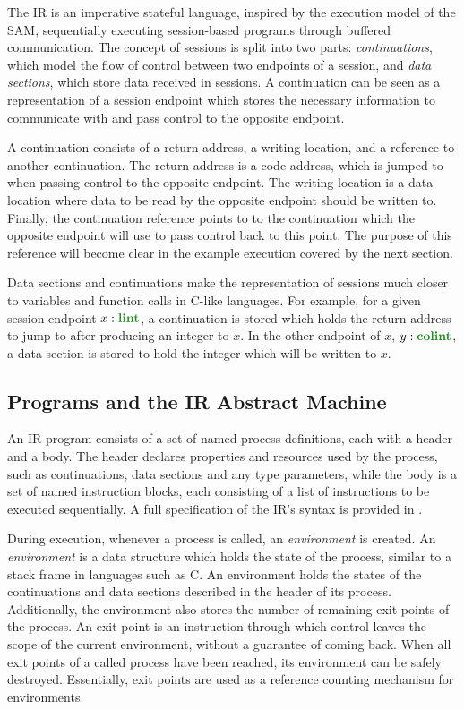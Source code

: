 The \ac{IR} is an imperative stateful language, inspired by the execution model of the \ac{SAM}, sequentially executing session-based programs through buffered communication. The concept of sessions is split into two parts: \textit{continuations}, which model the flow of control between two endpoints of a session, and \textit{data sections}, which store data received in sessions. A continuation can be seen as a representation of a session endpoint which stores the necessary information to communicate with and pass control to the opposite endpoint.

A continuation consists of a return address, a writing location, and a reference to another continuation. The return address is a code address, which is jumped to when passing control to the opposite endpoint. The writing location is a data location where data to be read by the opposite endpoint should be written to. Finally, the continuation reference points to to the continuation which the opposite endpoint will use to pass control back to this point. The purpose of this reference will become clear in the example execution covered by the next section.

Data sections and continuations make the representation of sessions much closer to variables and function calls in C-like languages. For example, for a given session endpoint $x: \lintt$, a continuation is stored which holds the return address to jump to after producing an integer to $x$. In the other endpoint of $x$, $y: \colintt$, a data section is stored to hold the integer which will be written to $x$.

\subsection{Programs and the IR Abstract Machine}

An \ac{IR} program consists of a set of named process definitions, each with a header and a body. The header declares properties and resources used by the process, such as continuations, data sections and any type parameters, while the body is a set of named instruction blocks, each consisting of a list of instructions to be executed sequentially. A full specification of the \ac{IR}'s syntax is provided in .

During execution, whenever a process is called, an \textit{environment} is created. An \textit{environment} is a data structure which holds the state of the process, similar to a stack frame in languages such as C. An environment holds the states of the continuations and data sections described in the header of its process. Additionally, the environment also stores the number of remaining exit points of the process. An exit point is an instruction through which control leaves the scope of the current environment, without a guarantee of coming back. When all exit points of a called process have been reached, its environment can be safely destroyed. Essentially, exit points are used as a reference counting mechanism for environments.

